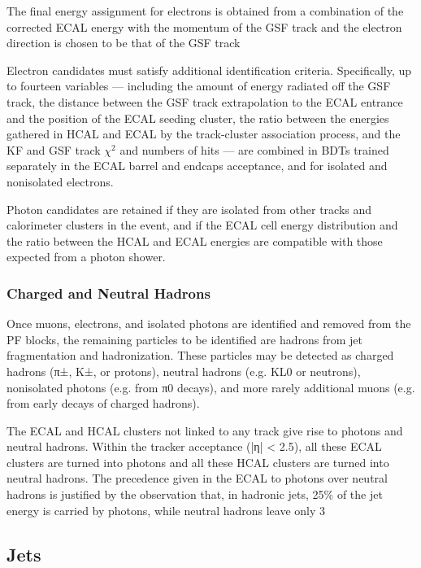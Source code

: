 The final energy assignment for electrons is obtained from a combination of the corrected ECAL energy with the momentum of the GSF track and the electron direction is chosen to be that of the GSF track

Electron candidates must satisfy additional identification criteria. Specifically, up to fourteen variables — including the amount of energy radiated off the GSF track, the distance between the GSF track extrapolation to the ECAL entrance and the position of the ECAL seeding cluster, the ratio between the energies gathered in HCAL and ECAL by the track-cluster association process, and the KF and GSF track $\chi^2$ and numbers of hits — are combined in BDTs trained separately in the ECAL barrel and endcaps acceptance, and for isolated and nonisolated electrons.

Photon candidates are retained if they are isolated from other tracks and calorimeter clusters in the event, and if the ECAL cell energy distribution and the ratio between the HCAL and ECAL energies are compatible with those expected from a photon shower.



\subsubsection{Charged and Neutral Hadrons}

Once muons, electrons, and isolated photons are identified and removed from the PF blocks, the remaining particles to be identified are hadrons from jet fragmentation and hadronization. These particles may be detected as charged hadrons (π±, K±, or protons), neutral hadrons (e.g. KL0 or neutrons), nonisolated photons (e.g. from π0 decays), and more rarely additional muons (e.g. from early decays of charged hadrons).

The ECAL and HCAL clusters not linked to any track give rise to photons and neutral hadrons. Within the tracker acceptance (|η| < 2.5), all these ECAL clusters are turned into photons and all these HCAL clusters are turned into neutral hadrons. The precedence given in the ECAL to photons over neutral hadrons is justified by the observation that, in hadronic jets, 25\% of the jet energy is carried by photons, while neutral hadrons leave only 3%

\subsection{Jets}

